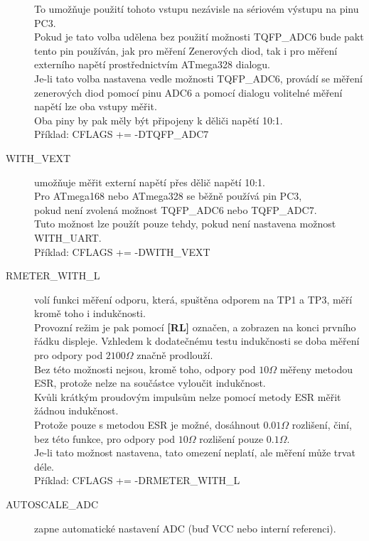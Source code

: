 \begin{description}
To umožňuje použití tohoto vstupu nezávisle na sériovém výstupu na pinu PC3.\\ Pokud je tato volba udělena
bez použití možnosti TQFP\_ADC6 bude pakt tento pin používán, jak pro měření Zenerových diod, tak i pro měření externího napětí prostřednictvím ATmega328 dialogu.\\
Je-li tato volba nastavena vedle možnosti TQFP\_ADC6, provádí se měření zenerových diod pomocí pinu ADC6 a  pomocí dialogu volitelné měření napětí lze oba vstupy měřit.\\ Oba piny by pak měly být připojeny k děliči napětí 10:1.\\
Příklad: CFLAGS += -DTQFP\_ADC7
\vspace{-0,3cm}
  \item[WITH\_VEXT]  umožňuje měřit externí napětí přes dělič napětí 10:1.\\
Pro ATmega168 nebo ATmega328 se běžně používá pin PC3,\\ pokud není zvolená možnost TQFP\_ADC6 nebo
TQFP\_ADC7.\\ Tuto možnost lze použít pouze tehdy, pokud není nastavena možnost WITH\_UART.\\
Příklad: CFLAGS += -DWITH\_VEXT 
\vspace{-0,3cm}
  \item[RMETER\_WITH\_L] volí funkci měření odporu, která, spuštěna odporem na TP1 a TP3,
 měří kromě toho i indukčnosti.\\ Provozní režim je pak pomocí {\bf[RL]} označen, a zobrazen na konci prvního řádku displeje. Vzhledem k dodatečnému testu indukčnosti se doba měření pro odpory pod \(2100\Omega\) značně prodlouží.\\ Bez této možnosti nejsou, kromě toho, odpory pod \(10\Omega\) měřeny metodou ESR,
protože  nelze na součástce vyloučit indukčnost.\\
Kvůli krátkým proudovým impulsům nelze pomocí metody ESR měřit žádnou indukčnost.\\
Protože pouze s metodou ESR je možné, dosáhnout \(0.01\Omega\) rozlišení, činí, bez této funkce, pro odpory pod
\(10\Omega\) rozlišení pouze \(0.1\Omega\).\\
Je-li tato možnost nastavena, tato omezení neplatí, ale měření může trvat déle.\\
Příklad: CFLAGS += -DRMETER\_WITH\_L
\vspace{-0,3cm}
  \item[AUTOSCALE\_ADC] zapne automatické nastavení ADC (buď VCC nebo interní referenci).\\

\end{description}
